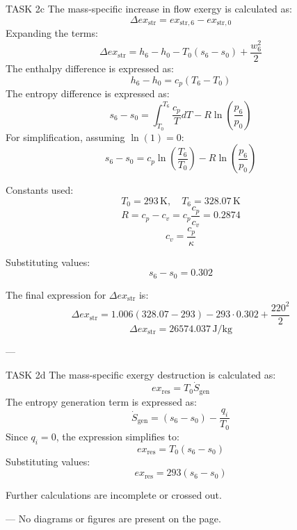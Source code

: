 TASK 2c  
The mass-specific increase in flow exergy is calculated as:  
\[
\Delta ex_{\text{str}} = ex_{\text{str},6} - ex_{\text{str},0}
\]  
Expanding the terms:  
\[
\Delta ex_{\text{str}} = h_6 - h_0 - T_0 (s_6 - s_0) + \frac{w_6^2}{2}
\]  
The enthalpy difference is expressed as:  
\[
h_6 - h_0 = c_p (T_6 - T_0)
\]  
The entropy difference is expressed as:  
\[
s_6 - s_0 = \int_{T_0}^{T_6} \frac{c_p}{T} dT - R \ln \left( \frac{p_6}{p_0} \right)
\]  
For simplification, assuming \( \ln(1) = 0 \):  
\[
s_6 - s_0 = c_p \ln \left( \frac{T_6}{T_0} \right) - R \ln \left( \frac{p_6}{p_0} \right)
\]  

Constants used:  
\[
T_0 = 293 \, \text{K}, \quad T_6 = 328.07 \, \text{K}
\]  
\[
R = c_p - c_v = c_p \frac{c_p}{c_v} = 0.2874
\]  
\[
c_v = \frac{c_p}{\kappa}
\]  

Substituting values:  
\[
s_6 - s_0 = 0.302
\]  

The final expression for \( \Delta ex_{\text{str}} \) is:  
\[
\Delta ex_{\text{str}} = 1.006 (328.07 - 293) - 293 \cdot 0.302 + \frac{220^2}{2}
\]  
\[
\Delta ex_{\text{str}} = 26574.037 \, \text{J/kg}
\]  

---

TASK 2d  
The mass-specific exergy destruction is calculated as:  
\[
ex_{\text{res}} = T_0 \dot{S}_{\text{gen}}
\]  
The entropy generation term is expressed as:  
\[
\dot{S}_{\text{gen}} = (s_6 - s_0) - \frac{q_i}{T_0}
\]  
Since \( q_i = 0 \), the expression simplifies to:  
\[
ex_{\text{res}} = T_0 (s_6 - s_0)
\]  
Substituting values:  
\[
ex_{\text{res}} = 293 (s_6 - s_0)
\]  

Further calculations are incomplete or crossed out.  

---  
No diagrams or figures are present on the page.